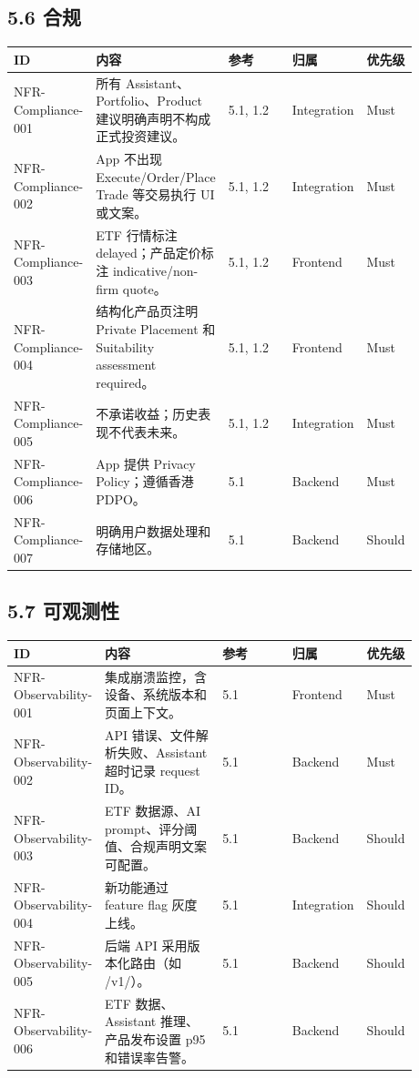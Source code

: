 \subsection{5.6 合规}

\begingroup
\small
\begin{longtable}{L{0.18\linewidth}L{0.30\linewidth}L{0.18\linewidth}L{0.12\linewidth}L{0.10\linewidth}}
\toprule
\textbf{ID} & \textbf{内容} & \textbf{参考} & \textbf{归属} & \textbf{优先级} \\
\midrule
NFR-Compliance-001 & 所有 Assistant、Portfolio、Product 建议明确声明不构成正式投资建议。 & 5.1, 1.2 & Integration & Must \\
NFR-Compliance-002 & App 不出现 Execute/Order/Place Trade 等交易执行 UI 或文案。 & 5.1, 1.2 & Integration & Must \\
NFR-Compliance-003 & ETF 行情标注 delayed；产品定价标注 indicative/non-firm quote。 & 5.1, 1.2 & Frontend & Must \\
NFR-Compliance-004 & 结构化产品页注明 Private Placement 和 Suitability assessment required。 & 5.1, 1.2 & Frontend & Must \\
NFR-Compliance-005 & 不承诺收益；历史表现不代表未来。 & 5.1, 1.2 & Integration & Must \\
NFR-Compliance-006 & App 提供 Privacy Policy；遵循香港 PDPO。 & 5.1 & Backend & Must \\
NFR-Compliance-007 & 明确用户数据处理和存储地区。 & 5.1 & Backend & Should \\
\bottomrule
\end{longtable}
\endgroup

\subsection{5.7 可观测性}

\begingroup
\small
\begin{longtable}{L{0.18\linewidth}L{0.30\linewidth}L{0.18\linewidth}L{0.12\linewidth}L{0.10\linewidth}}
\toprule
\textbf{ID} & \textbf{内容} & \textbf{参考} & \textbf{归属} & \textbf{优先级} \\
\midrule
NFR-Observability-001 & 集成崩溃监控，含设备、系统版本和页面上下文。 & 5.1 & Frontend & Must \\
NFR-Observability-002 & API 错误、文件解析失败、Assistant 超时记录 request ID。 & 5.1 & Backend & Must \\
NFR-Observability-003 & ETF 数据源、AI prompt、评分阈值、合规声明文案可配置。 & 5.1 & Backend & Should \\
NFR-Observability-004 & 新功能通过 feature flag 灰度上线。 & 5.1 & Integration & Should \\
NFR-Observability-005 & 后端 API 采用版本化路由（如 /v1/）。 & 5.1 & Backend & Should \\
NFR-Observability-006 & ETF 数据、Assistant 推理、产品发布设置 p95 和错误率告警。 & 5.1 & Backend & Should \\
\bottomrule
\end{longtable}
\endgroup
